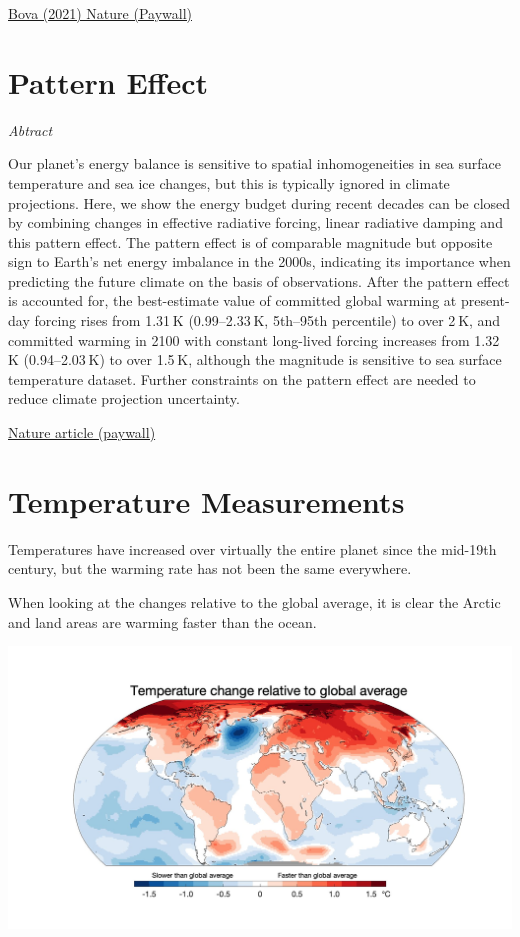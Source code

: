 \documentclass[
]{book}
\begin{document}
\href{https://www.nature.com/articles/s41586-020-03155-x}{Bova (2021) Nature (Paywall)}

\hypertarget{pattern-effect}{%
\chapter{Pattern Effect}\label{pattern-effect}}

\emph{Abtract}

Our planet's energy balance is sensitive to spatial inhomogeneities in sea surface temperature and sea ice changes, but this is typically ignored in climate projections. Here, we show the energy budget during recent decades can be closed by combining changes in effective radiative forcing, linear radiative damping and this pattern effect. The pattern effect is of comparable magnitude but opposite sign to Earth's net energy imbalance in the 2000s, indicating its importance when predicting the future climate on the basis of observations. After the pattern effect is accounted for, the best-estimate value of committed global warming at present-day forcing rises from 1.31 K (0.99--2.33 K, 5th--95th percentile) to over 2 K, and committed warming in 2100 with constant long-lived forcing increases from 1.32 K (0.94--2.03 K) to over 1.5 K, although the magnitude is sensitive to sea surface temperature dataset. Further constraints on the pattern effect are needed to reduce climate projection uncertainty.

\href{https://www.nature.com/articles/s41558-020-00955-x}{Nature article (paywall)}

\hypertarget{temperature-measurements}{%
\chapter{Temperature Measurements}\label{temperature-measurements}}

Temperatures have increased over virtually the entire planet since the mid-19th century, but the warming rate has not been the same everywhere.

When looking at the changes relative to the global average, it is clear the Arctic and land areas are warming faster than the ocean.

\includegraphics{fig/World_Temp_Change_Speed.jpeg}
\end{document}
